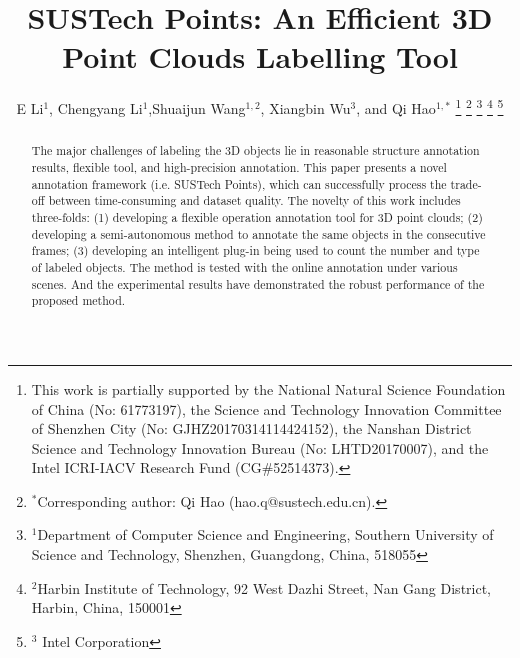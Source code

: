 \documentclass[letterpaper, 10 pt, conference]{ieeeconf}  %
\title{\LARGE \bf
SUSTech Points: An Efficient 3D Point Clouds Labelling Tool
}
\author{E Li$^{1}$, Chengyang Li$^{1}$,Shuaijun Wang$^{1,2}$, Xiangbin Wu$^{3}$, and Qi Hao$^{1,*}$%
\thanks{This work is partially supported by the National Natural Science Foundation of China (No: 61773197), the Science and Technology Innovation Committee of Shenzhen City (No: GJHZ20170314114424152), the Nanshan District Science and Technology Innovation Bureau (No: LHTD20170007), and the Intel ICRI-IACV Research Fund (CG$\#$52514373).}
\thanks{$^{*}$Corresponding author: Qi Hao (hao.q@sustech.edu.cn).}
\thanks{$^{1}$Department of Computer Science and Engineering,
Southern University of Science and Technology, Shenzhen, Guangdong, China, 518055}
\thanks{$^{2}$Harbin Institute of Technology,
92 West Dazhi Street, Nan Gang District, Harbin, China, 150001}%
\thanks{$^{3}$ Intel Corporation}%
}
\begin{document}
\maketitle
\thispagestyle{empty}
\pagestyle{empty}
\begin{abstract}
The major challenges of labeling the 3D objects lie in reasonable structure annotation results, flexible tool, and high-precision annotation. This paper presents a novel annotation framework (i.e. SUSTech Points), which can successfully process the trade-off between time-consuming and dataset quality. The novelty of this work includes three-folds: (1) developing a flexible operation annotation tool for 3D point clouds; (2) developing a semi-autonomous method to annotate the same objects in the consecutive frames; (3) developing an intelligent plug-in being used to count the number and type of labeled objects. The method is tested with the online annotation under various scenes. And the experimental results have demonstrated the robust performance of the proposed method.
\end{abstract}


\end{document}
